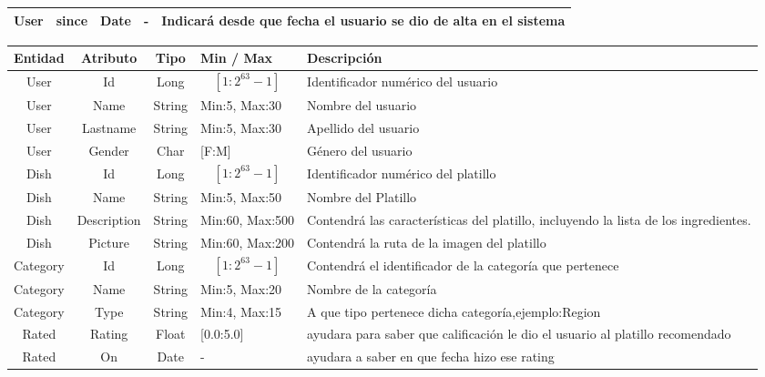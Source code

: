 \begin{landscape}
\begin{table}[h]
\begin{center}
\begin{tabular}{| c | c | c | p{3cm} | p{12cm}|}
        \midrule
        User & since  & Date & - & Indicará desde que fecha el usuario se dio de alta en el sistema \\
        \bottomrule
      \end{tabular}
    \end{center}
  \end{table}
 \newpage
  \begin{table}
    \begin{center}
      \begin{tabular}{| c | c | c | p{3cm} | p{12cm}|} 
        \toprule
        Entidad & Atributo & Tipo & Min / Max & Descripción\\
        \midrule
        User & Id  & Long & \[[1:2^{63}-1]\] & Identificador numérico del usuario\\
        \midrule
        User & Name  & String & Min:5, Max:30  & Nombre del usuario \\
        \midrule
        User & Lastname  & String & Min:5, Max:30 & Apellido del usuario \\
        \midrule
        User & Gender  & Char & [F:M]  & Género del usuario \\
        \midrule
        Dish & Id & Long & \[[1:2^{63}-1]\] & Identificador numérico del platillo\\
        \midrule
        Dish & Name  & String & Min:5, Max:50  & Nombre del Platillo \\
        \midrule
        Dish & Description & String & Min:60, Max:500  & Contendrá las características del platillo, incluyendo la lista de los ingredientes. \\
        \midrule
        Dish & Picture  & String & Min:60, Max:200 & Contendrá la ruta de la imagen del platillo \\
        \midrule
        Category & Id & Long & \[[1:2^{63}-1]\] & Contendrá el identificador de la categoría que pertenece \\
        \midrule
       	Category & Name  & String & Min:5, Max:20  & Nombre de la categoría \\
        \midrule
        Category & Type  & String & Min:4, Max:15  & A que tipo pertenece dicha categoría,ejemplo:Region \\
        \midrule
        Rated & Rating  & Float & [0.0:5.0]  & ayudara para saber que calificación le dio el usuario 			al platillo recomendado  \\
        \midrule
        Rated & On  & Date & -  & ayudara a saber en que fecha hizo ese rating \\

\end{tabular}
\end{center}
\end{table}
\end{landscape}
